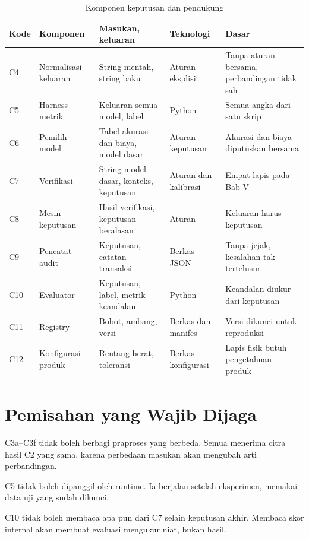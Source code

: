 \documentclass[12pt,a4paper,oneside]{report}
\begin{document}
\begin{table}[H]
\caption{Komponen keputusan dan pendukung}
\label{tab:komponen2}
\begin{tabularx}{\textwidth}{@{}L{0.9cm} L{2.9cm} L{3.4cm} L{2.6cm} X@{}}
\toprule
\textbf{Kode} & \textbf{Komponen} & \textbf{Masukan, keluaran} & \textbf{Teknologi} & \textbf{Dasar} \\
\midrule
C4 & Normalisasi keluaran & String mentah, string baku & Aturan eksplisit & Tanpa aturan bersama, perbandingan tidak sah \\
C5 & Harness metrik & Keluaran semua model, label & Python & Semua angka dari satu skrip \\
C6 & Pemilih model & Tabel akurasi dan biaya, model dasar & Aturan keputusan & Akurasi dan biaya diputuskan bersama \\
C7 & Verifikasi & String model dasar, konteks, keputusan & Aturan dan kalibrasi & Empat lapis pada Bab V \\
C8 & Mesin keputusan & Hasil verifikasi, keputusan beralasan & Aturan & Keluaran harus keputusan \\
C9 & Pencatat audit & Keputusan, catatan transaksi & Berkas JSON & Tanpa jejak, kesalahan tak tertelusur \\
C10 & Evaluator & Keputusan, label, metrik keandalan & Python & Keandalan diukur dari keputusan \\
C11 & Registry & Bobot, ambang, versi & Berkas dan manifes & Versi dikunci untuk reproduksi \\
C12 & Konfigurasi produk & Rentang berat, toleransi & Berkas konfigurasi & Lapis fisik butuh pengetahuan produk \\
\bottomrule
\end{tabularx}
\end{table}\section{Pemisahan yang Wajib Dijaga}

\begin{poin}
  \item C3a--C3f tidak boleh berbagi praproses yang berbeda. Semua menerima
        citra hasil C2 yang sama, karena perbedaan masukan akan mengubah arti
        perbandingan.
  \item C5 tidak boleh dipanggil oleh runtime. Ia berjalan setelah eksperimen,
        memakai data uji yang sudah dikunci.
  \item C10 tidak boleh membaca apa pun dari C7 selain keputusan akhir. Membaca
        skor internal akan membuat evaluasi mengukur niat, bukan hasil.
\end{poin}
\end{document}
